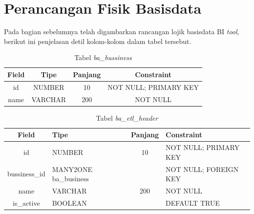 	\section{Perancangan Fisik Basisdata}
	Pada bagian sebelumnya telah digambarkan rancangan lojik basisdata BI \textit{tool}, berikut ini penjelasan detil kolom-kolom dalam tabel tersebut.
	\begin{table}[H]
	\centering
		\caption{Tabel \textit{ba\_bussiness}}
		\begin{tabular}{ | c | c| c | c | }
			\hline
				Field & Tipe & Panjang & Constraint \\ \hline \hline
			id & NUMBER & 10 & NOT NULL; PRIMARY KEY  \\ \hline
			name & VARCHAR & 200 & NOT NULL  \\ 		\hline 
		\end{tabular}
\end{table}

\begin{table}[H]
	\centering
		\caption{Tabel \textit{ba\_etl\_header}}
		\begin{tabular}{ | c | p{4cm} | c | p{4cm} |}
			\hline
				Field & Tipe & Panjang & Constraint \\ \hline \hline
			id & NUMBER & 10 & NOT NULL; PRIMARY KEY  \\ \hline
			bussiness\_id & MANY2ONE ba\_business& & NOT NULL; FOREIGN KEY  \\ \hline 
			name & VARCHAR & 200 & NOT NULL \\ \hline 
			is\_active & BOOLEAN &  & DEFAULT TRUE  \\ \hline 
		\end{tabular}
\end{table}

